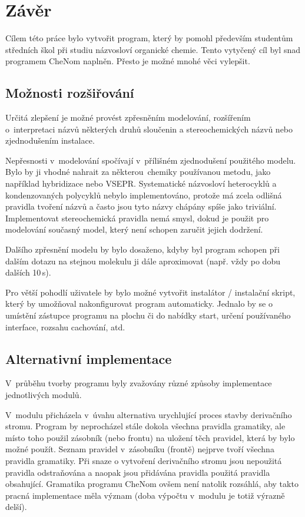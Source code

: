 \chapter{Závěr}
Cílem této práce bylo vytvořit program, který by pomohl především studentům
středních škol při studiu názvosloví organické chemie. Tento vytyčený cíl byl
snad programem CheNom naplněn. Přesto je možné mnohé věci vy\-lep\-šit.

\section{Možnosti rozšiřování}
Určitá zlepšení je možné provést zpřesněním modelování, rozšířením o~interpretaci
názvů některých druhů sloučenin a stereochemických názvů nebo zjednodušením
instalace.

Nepřesnosti v~modelování spočívají v~přílišném zjednodušení použitého modelu.
Bylo by ji vhodné nahrait za některou~chemiky používanou metodu, jako například
hybridizace nebo VSEPR\cite{Micka:anorgana}. Systematické názvosloví heterocyklů
a kondenzovaných polycyklů nebylo implementováno, protože má zcela odlišná
pravidla tvoření názvů a často jsou tyto názvy chápány spíše jako triviální.
Implementovat stereochemická pravidla nemá smysl, dokud je použit pro modelování
současný model, který není schopen zaručit jejich dodržení.

Dalšího zpřesnění modelu by bylo dosaženo, kdyby byl program schopen při dalším
dotazu na stejnou molekulu ji dále aproximovat (např. vždy po dobu dalších 10\,s).

Pro větší pohodlí uživatele by bylo možné vytvořit instalátor / instalační
skript, který by umožňoval nakonfigurovat program automaticky. Jednalo by se o
umístění zástupce programu na plochu či do nabídky start, určení používaného
interface, rozsahu cachování, atd.

\section{Alternativní implementace}
V~průběhu tvorby programu byly zvažovány různé způsoby implementace jednotlivých
modulů.

V~modulu  přicházela v~úvahu alternativa urychlující proces stavby
derivačního stromu. Program by neprocházel stále dokola všechna pravidla
gramatiky, ale místo toho použil zásobník (nebo frontu) na uložení těch
pravidel, která by bylo možné použít. Seznam pravidel v~zásobníku (frontě)
nejprve tvoří všechna pravidla gramatiky. Při snaze o vytvoření derivačního
stromu jsou nepoužitá pravidla odstraňována a naopak jsou přidávána pravidla
po\-u\-ži\-tá pravidla obsahující. Gramatika programu CheNom ovšem není natolik
rozsáhlá, aby takto pracná implementace měla význam (doba výpočtu v~modulu
 je totiž výrazně delší).

